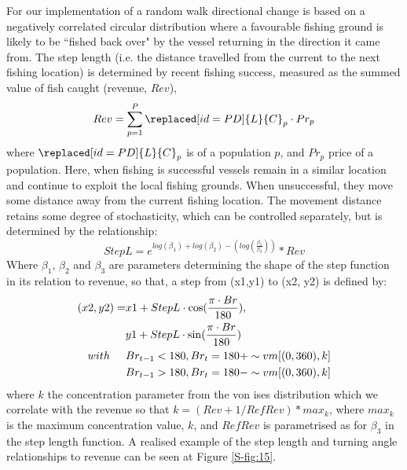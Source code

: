 \documentclass[review]{elsarticle}
\begin{document}
For our implementation of a random walk directional change is based on a
negatively correlated circular distribution where a favourable fishing ground
is likely to be ``fished back over" by the vessel returning in the direction it
came from.  The step length (i.e. the distance travelled from the current to
the next fishing location) is determined by  recent
fishing success, measured as the summed value of fish caught (revenue, $Rev$),
\begin{equation}
Rev = \sum_{p=1}^{P} \replaced[id=PD]{L}{C}_{p} \cdot Pr_{p} 
\end{equation}
where $\replaced[id=PD]{L}{C}_{p}$ is  of a
population $p$, and $Pr_{p}$ price of a population. Here, when fishing is
successful vessels remain in a similar location and continue to exploit the
local fishing grounds. When unsuccessful, they move some distance away from
the current fishing location.  The movement distance retains some degree of
stochasticity, which can be controlled separately, but is determined by the
relationship: 
\begin{equation}
	StepL = e^{log(\beta_{1}) + log(\beta_{2}) -
		(log(\frac{\beta_{1}}{\beta_{3}}))} * Rev
\end{equation}
Where $\beta_{1}$, $\beta_{2}$ and $\beta_{3}$ are parameters determining the
shape of the step function in its relation to revenue, so that, a step from
(x1,y1) to (x2, y2) is defined by:
\begin{equation}
	\begin{split}
 (x2, y2) =  & x1 + StepL \cdot \cos (\frac{\pi \cdot Br}{180}), \\
             & y1 + StepL \cdot \sin (\frac{\pi \cdot Br}{180}) \\	
 with  \hspace{0.5cm}     & Br_{t-1} < 180, Br_{t} = 180 + \sim vm[(0,360), k] \\
 			  & Br_{t-1} > 180, Br_{t} = 180 - \sim vm[(0,360), k] \\
	\end{split}
\end{equation}
where $k$ the concentration parameter from the von ises
distribution which we correlate with the revenue so that $k = (Rev + 1 /
RefRev) * max_{k}$, where $max_{k}$ is the maximum concentration value, $k$,
and $RefRev$ is parametrised as for $\beta_{3}$ in the step length function. A
realised example of the step length and turning angle relationships to revenue
can be seen at Figure \ref{S-fig:15}.
\end{document}
